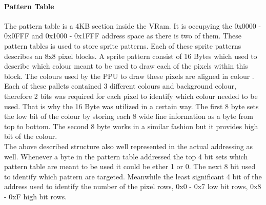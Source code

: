 \documentclass[]{report}
\begin{document}
\paragraph{Pattern Table} 
The pattern table \cite{PTRN} is a 4KB section inside the VRam. It is occupying the 0x0000 - 0x0FFF and 0x1000 - 0x1FFF address space as there is two of them.  These pattern tables is used to store sprite patterns.  Each of these sprite patterns describes an 8x8 pixel blocks. A sprite pattern consist of 16 Bytes which used to describe which colour meant to be used to draw each of the pixels within this block. The colours used by the PPU to draw these pixels are aligned in colour . Each of these pallets contained 3 different colours and background colour, therefore 2 bits was required for each pixel to identify which colour needed to be used. That is why the 16 Byte was utilized in a certain way. The first 8 byte sets the low bit of the colour by storing each 8 wide line information as a byte from top to bottom. The second 8 byte works in a similar fashion but it provides high bit of the colour.
\\
The above described structure also well represented in the actual addressing as well. Whenever a byte in the pattern table addressed the top 4 bit sets which pattern table are meant to be used it could be ether 1 or 0. The next 8 bit used to identify which pattern are targeted. Meanwhile the least significant 4 bit of the address used to identify the number of the pixel rows, 0x0 - 0x7 low bit rows, 0x8 - 0xF high bit rows.
\end{document}
